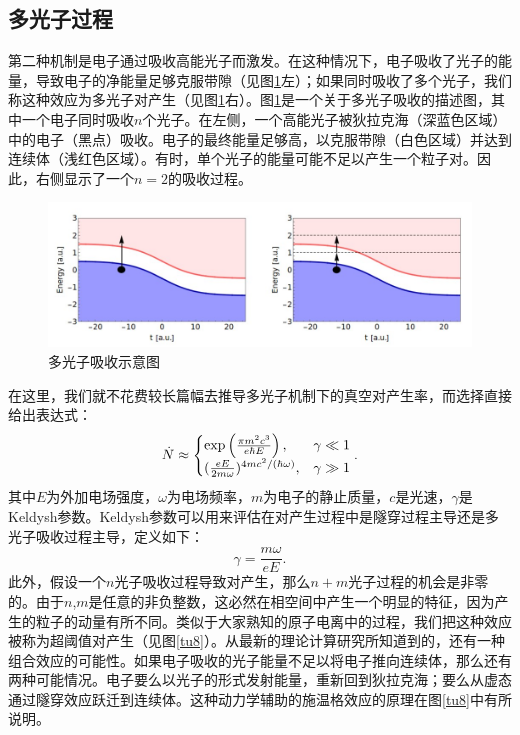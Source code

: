\subsection{多光子过程}

第二种机制是电子通过吸收高能光子而激发。在这种情况下，电子吸收了光子的能量，导致电子的净能量足够克服带隙（见图\ref{tu7}左）；如果同时吸收了多个光子，我们称这种效应为多光子对产生（见图\ref{tu7}右）。图\ref{tu7}是一个关于多光子吸收的描述图，其中一个电子同时吸收$n$个光子。在左侧，一个高能光子被狄拉克海（深蓝色区域）中的电子（黑点）吸收。电子的最终能量足够高，以克服带隙（白色区域）并达到连续体（浅红色区域）。有时，单个光子的能量可能不足以产生一个粒子对。因此，右侧显示了一个$n = 2$的吸收过程。

\begin{figure}
  \centering
  \includegraphics[width=0.8\linewidth]{figures/fig/fig1.7.jpg}
  \caption{多光子吸收示意图}
  \label{tu7}
\end{figure}

在这里，我们就不花费较长篇幅去推导多光子机制下的真空对产生率，而选择直接给出表达式：
\begin{equation}\label{ND}
 \dot N \approx \begin{cases}  \exp \left(\-\frac{\pi m^2 c^3}{e \hbar E}\right), & \gamma \ll 1 \\ (\frac{e E}{2m \omega})^{4mc^2/ (\hbar \omega)}, & \gamma \gg 1\end{cases}.
\end{equation}
其中$E$为外加电场强度，$\omega$为电场频率，$m$为电子的静止质量，$c$是光速，$\gamma$是Keldysh参数。Keldysh参数可以用来评估在对产生过程中是隧穿过程主导还是多光子吸收过程主导，定义如下：
\begin{equation}\label{Keldysh3}
 \gamma = \frac{m \omega}{e E}.
\end{equation}
此外，假设一个$n$光子吸收过程导致对产生，那么$n+m$光子过程的机会是非零的。由于$n$,$m$是任意的非负整数，这必然在相空间中产生一个明显的特征，因为产生的粒子的动量有所不同。类似于大家熟知的原子电离中的过程，我们把这种效应被称为超阈值对产生（见图\ref{tu8}）。从最新的理论计算研究所知道到的，还有一种组合效应的可能性。如果电子吸收的光子能量不足以将电子推向连续体，那么还有两种可能情况。电子要么以光子的形式发射能量，重新回到狄拉克海；要么从虚态通过隧穿效应跃迁到连续体。这种动力学辅助的施温格效应的原理在图\ref{tu8}中有所说明。

